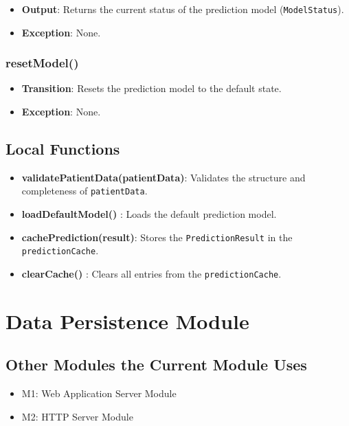 \documentclass[12pt, titlepage]{article}
\begin{document}
\begin{itemize}
    \item \textbf{Output}: Returns the current status of the prediction model (\texttt{ModelStatus}).
    \item \textbf{Exception}: None.
\end{itemize}

\subsubsection{resetModel()}

\begin{itemize}
    \item \textbf{Transition}: Resets the prediction model to the default state.
    \item \textbf{Exception}: None.
\end{itemize}

\subsection{Local Functions}
\begin{itemize}
    \item \textbf{validatePatientData(patientData)}: Validates the structure and completeness of \texttt{patientData}.
    \item \textbf{loadDefaultModel()} : Loads the default prediction model.
    \item \textbf{cachePrediction(result)}: Stores the \texttt{PredictionResult} in the \texttt{predictionCache}.
    \item \textbf{clearCache()} : Clears all entries from the \texttt{predictionCache}.
\end{itemize}

\section{Data Persistence Module}
\label{Data Persistence Module}

\subsection{Other Modules the Current Module Uses}
\begin{itemize}
    \item M1: Web Application Server Module
    \item M2: HTTP Server Module
\end{itemize}
\end{document}
